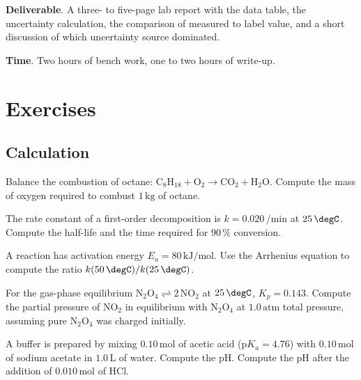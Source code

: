 \begin{project}
\textbf{Deliverable}. A three- to five-page lab report with the data
table, the uncertainty calculation, the comparison of measured to
label value, and a short discussion of which uncertainty source
dominated.

\textbf{Time}. Two hours of bench work, one to two hours of write-up.
\end{project}

\section{Exercises}

\subsection*{Calculation}

\begin{exercise}
Balance the combustion of octane: $\text{C}_8\text{H}_{18} +
\text{O}_2 \to \text{CO}_2 + \text{H}_2\text{O}$. Compute the mass of
oxygen required to combust $1\,\text{kg}$ of octane.
\end{exercise}

\begin{exercise}
The rate constant of a first-order decomposition is $k = 0.020\,\si{\per\minute}$
at $25\,\degC$. Compute the half-life and the time required for $90\,\%$
conversion.
\end{exercise}

\begin{exercise}
A reaction has activation energy $E_a = 80\,\text{kJ}/\text{mol}$. Use
the Arrhenius equation to compute the ratio $k(50\,\degC)/k(25\,\degC)$.
\end{exercise}

\begin{exercise}
For the gas-phase equilibrium $\text{N}_2\text{O}_4 \rightleftharpoons
2\,\text{NO}_2$ at $25\,\degC$, $K_p = 0.143$. Compute the partial
pressure of NO$_2$ in equilibrium with N$_2$O$_4$ at $1.0\,\text{atm}$
total pressure, assuming pure N$_2$O$_4$ was charged initially.
\end{exercise}

\begin{exercise}
A buffer is prepared by mixing $0.10\,\text{mol}$ of acetic acid
($\text{p}K_a = 4.76$) with $0.10\,\text{mol}$ of sodium acetate in
$1.0\,\text{L}$ of water. Compute the pH. Compute the pH after the
addition of $0.010\,\text{mol}$ of HCl.
\end{exercise}

